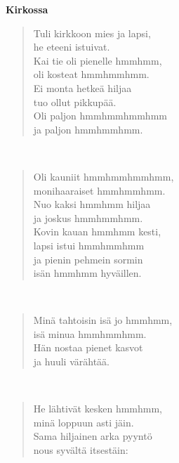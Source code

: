 %
%
\noindent\begin{minipage}{\linewidth}
\vspace{5pt}
\parbox[t]{0.85\linewidth}{\raggedright {\large\bf Kirkossa}\\[6pt]}
\begin{verse}
	Tuli kirkkoon mies ja lapsi,\\
	he eteeni istuivat.\\
	Kai tie oli pienelle hmmhmm,\\
	oli kosteat hmmhmmhmm.\\
	Ei monta hetkeä hiljaa\\
	tuo ollut pikkupää.\\
	Oli paljon hmmhmmhmmhmm\\
	ja paljon hmmhmmhmm.\\
\end{verse}
\end{minipage}\\[10pt]
\noindent\begin{minipage}{\linewidth}
\begin{verse}
	Oli kauniit hmmhmmhmmhmm,\\
	monihaaraiset hmmhmmhmm.\\
	Nuo kaksi hmmhmm hiljaa\\
	ja joskus hmmhmmhmm.\\
	Kovin kauan hmmhmm kesti,\\
	lapsi istui hmmhmmhmm\\
	ja pienin pehmein sormin\\
	isän hmmhmm hyväillen.\\
\end{verse}
\end{minipage}\\[10pt]
\noindent\begin{minipage}{\linewidth}
\begin{verse}
	Minä tahtoisin isä jo hmmhmm,\\
	isä minua hmmhmmhmm.\\
	Hän nostaa pienet kasvot\\
	ja huuli värähtää.\\
\end{verse}
\end{minipage}\\[10pt]
\noindent\begin{minipage}{\linewidth}
\begin{verse}
	He lähtivät kesken hmmhmm,\\
	minä loppuun asti jäin.\\
	Sama hiljainen arka pyyntö\\
	nous syvältä itsestäin:\\
\end{verse}
\end{minipage}\\[10pt]

